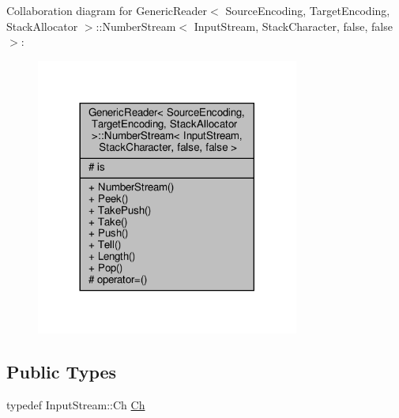Collaboration diagram for Generic\+Reader$<$ Source\+Encoding, Target\+Encoding, Stack\+Allocator $>$\+:\+:Number\+Stream$<$ Input\+Stream, Stack\+Character, false, false $>$\+:
\nopagebreak
\begin{figure}[H]
\begin{center}
\leavevmode
\includegraphics[width=245pt]{classGenericReader_1_1NumberStream_3_01InputStream_00_01StackCharacter_00_01false_00_01false_01_4__coll__graph}
\end{center}
\end{figure}
\subsection*{Public Types}
\begin{DoxyCompactItemize}
\item 
typedef Input\+Stream\+::\+Ch \hyperlink{classGenericReader_1_1NumberStream_3_01InputStream_00_01StackCharacter_00_01false_00_01false_01_4_a2971d286306cf8df899b87ea9dd24f27}{Ch}
\end{DoxyCompactItemize}
